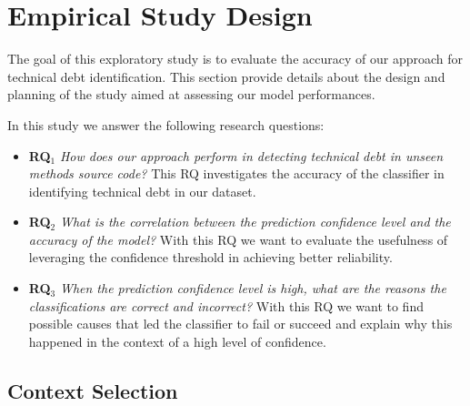 \chapter{Empirical Study Design}


The goal of this exploratory study is to evaluate the accuracy of our approach for technical debt identification.
This section provide details about the design and planning of the study aimed at assessing our model performances.
 

In this study we answer the following research questions:
\begin{itemize}
    \item \textbf{RQ$_1$} \textit{How does our approach perform in detecting technical debt in unseen methods source code?} This RQ investigates the accuracy of the classifier in identifying technical debt in our dataset.
    \item \textbf{RQ$_2$} \textit{What is the correlation between the prediction confidence level and the accuracy of the model?} With this RQ we want to evaluate the usefulness of leveraging the confidence threshold in achieving better reliability.
    \item \textbf{RQ$_3$} \textit{When the prediction confidence level is high, what are the reasons the classifications are correct and incorrect?} With this RQ we want to find possible causes that led the classifier to fail or succeed and explain why this happened in the context of a high level of confidence.
\end{itemize}
 


\section{Context Selection}
% 


%


